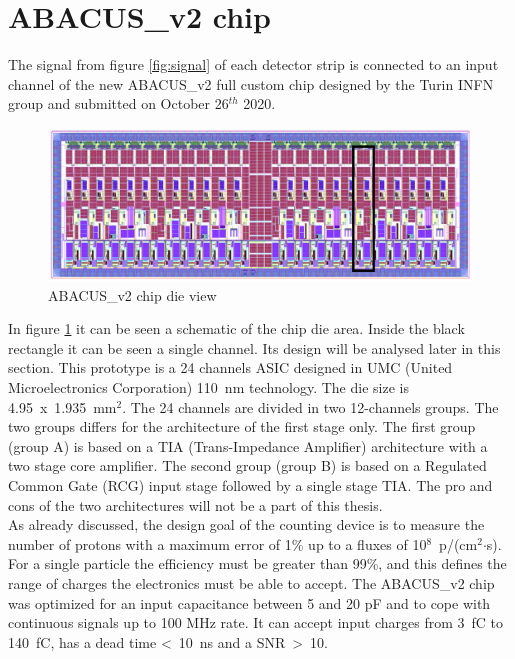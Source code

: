 \section{ABACUS\_v2 chip}\label{chip}
\noindent The signal from figure \ref{fig:signal} of each detector strip is connected to an input channel of the new ABACUS\_v2 full custom chip\cite{abacus}\cite{dac} designed by the Turin INFN group and submitted on October 26$^{th}$ 2020.
\begin{figure}[H]
	\centering
	\includegraphics[width=0.9\linewidth]{IMG/ch2/ABACUS2.png}
	\caption{ABACUS\_v2 chip die view}
	\label{fig:abacus2}
\end{figure}
\noindent In figure \ref{fig:abacus2} it can be seen a schematic of the chip die area. Inside the black rectangle it can be seen a single channel. Its design will be analysed later in this section.
This prototype is a 24 channels ASIC designed in UMC (United Microelectronics Corporation) 110~nm technology.
The die size is 4.95~x~1.935~mm$^2$.
The 24 channels are divided in two 12-channels groups. The two groups differs for the architecture of the first stage only.
The first group (group A) is based on a TIA (Trans-Impedance Amplifier) architecture with a two stage core amplifier.
The second group (group B) is based on a Regulated Common Gate (RCG) input stage followed by a single stage TIA.
The pro and cons of the two architectures will not be a part of this thesis.\\
As already discussed, the design goal of the counting device is to measure the number of protons with a maximum error of 1\% up to a fluxes of 10$^8$~p/(cm$^2$$\cdot$s).
For a single particle the efficiency must be greater than 99\%, and this defines the range of charges the electronics must be able to accept.
The ABACUS\_v2 chip was optimized for an input capacitance between 5 and 20 pF and to cope with continuous signals up to 100 MHz rate.
It can accept input charges from 3~fC to 140~fC, has a dead time <~10~ns and a SNR~>~10. 

